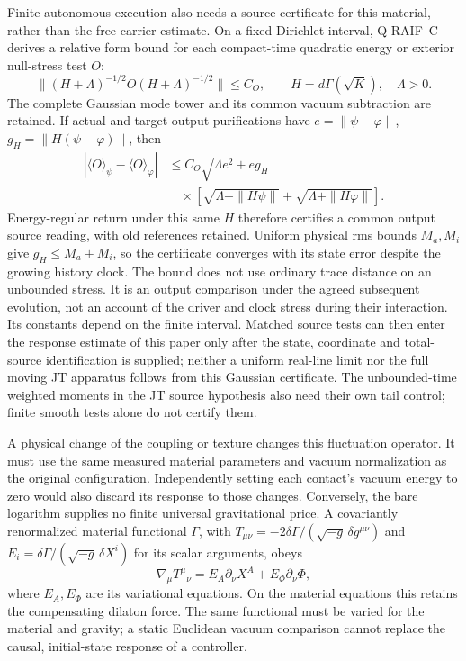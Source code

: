 \documentclass[12pt,a4paper]{article}
\begin{document}
Finite autonomous execution also needs a source certificate for this
material, rather than the free-carrier estimate. On a fixed Dirichlet
interval, Q-RAIF~C derives a relative form bound for each compact-time
quadratic energy or exterior null-stress test $O$:
\[
 \|(H+\Lambda)^{-1/2}O(H+\Lambda)^{-1/2}\|\le C_O,
 \qquad H=d\Gamma(\sqrt K),\quad\Lambda>0.
\]
The complete Gaussian mode tower and its common vacuum subtraction
are retained. If actual and target output purifications have
$e=\|\psi-\varphi\|$, $g_H=\|H(\psi-\varphi)\|$, then
\begin{align}
 |\langle O\rangle_\psi-\langle O\rangle_\varphi|
 &\le C_O\sqrt{\Lambda e^2+eg_H}\nonumber\\
 &\quad\times\left[\sqrt{\Lambda+\|H\psi\|}
                    +\sqrt{\Lambda+\|H\varphi\|}\right].
 \label{eq:Gaussian-material-source-error}
\end{align}
Energy-regular return under this same $H$ therefore certifies a common
output source reading, with old references retained. Uniform physical
rms bounds $M_a,M_i$ give $g_H\le M_a+M_i$, so the certificate
converges with its state error despite the growing history clock.
The bound does
not use ordinary trace distance on an unbounded stress. It is an
output comparison under the agreed subsequent evolution, not an
account of the driver and clock stress during their interaction.
Its constants depend on the finite interval. Matched source tests
can then enter the response estimate of this paper only after the
state, coordinate and total-source identification is supplied;
neither a uniform real-line limit nor the full moving JT apparatus
follows from this Gaussian certificate.
The unbounded-time weighted moments in the JT source hypothesis
also need their own tail control; finite smooth tests alone do not
certify them.

A physical change of the coupling or texture changes this fluctuation
operator. It must use the same measured material parameters and vacuum
normalization as the original configuration. Independently setting each
contact's vacuum energy to zero would also discard its response to those
changes. Conversely, the bare logarithm supplies no finite universal
gravitational price. A covariantly renormalized material functional
$\Gamma$, with $T_{\mu\nu}=-2\delta\Gamma/(\sqrt{-g}\,\delta g^{\mu\nu})$
and $E_i=\delta\Gamma/(\sqrt{-g}\,\delta X^i)$ for its scalar arguments, obeys
\[
 \nabla_\mu T^\mu{}_{\nu}=E_A\partial_\nu X^A+E_\Phi\partial_\nu\Phi,
\]
where $E_A,E_\Phi$ are its variational equations. On the material equations
this retains the compensating dilaton force. The same functional must
be varied for the material and gravity; a static Euclidean vacuum
comparison cannot replace the causal, initial-state response of a controller.
\end{document}
